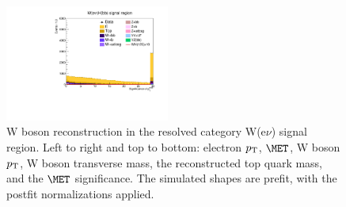 \begin{figure}[tbp]
\begin{center}
    \includegraphics[width=0.48\textwidth]{figures/wlnhbb2016/resolved/WenWHSR_pfmetsig.pdf}
    \caption{W boson reconstruction in the resolved category W(e$\nu$) signal region.
    Left to right and top to bottom: electron $p_{\mathrm{T}}$, $\MET$, W boson $p_{\mathrm{T}}$, W boson transverse mass,
    the reconstructed top quark mass, and the $\MET$ significance.
    The simulated shapes are prefit, with the postfit normalizations applied.}
    \label{fig:res_WenSR_WBosons}
  \end{center}
\end{figure}
\clearpage

